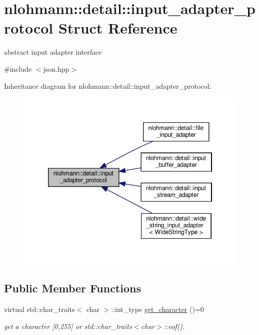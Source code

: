 \hypertarget{structnlohmann_1_1detail_1_1input__adapter__protocol}{}\section{nlohmann\+:\+:detail\+:\+:input\+\_\+adapter\+\_\+protocol Struct Reference}
\label{structnlohmann_1_1detail_1_1input__adapter__protocol}


abstract input adapter interface  




{\ttfamily \#include $<$json.\+hpp$>$}



Inheritance diagram for nlohmann\+:\+:detail\+:\+:input\+\_\+adapter\+\_\+protocol\+:
\nopagebreak
\begin{figure}[H]
\begin{center}
\leavevmode
\includegraphics[width=346pt]{structnlohmann_1_1detail_1_1input__adapter__protocol__inherit__graph}
\end{center}
\end{figure}
\subsection*{Public Member Functions}
\begin{DoxyCompactItemize}
\item 
\mbox{\label{structnlohmann_1_1detail_1_1input__adapter__protocol_aac10a6a4048a8ce8e2ed50277692a3ca}} 
virtual std\+::char\+\_\+traits$<$ char $>$\+::int\+\_\+type \hyperlink{structnlohmann_1_1detail_1_1input__adapter__protocol_aac10a6a4048a8ce8e2ed50277692a3ca}{get\+\_\+character} ()=0
\begin{DoxyCompactList}\small\item\em get a character \mbox{[}0,255\mbox{]} or std\+::char\+\_\+traits$<$char$>$\+::eof(). \end{DoxyCompactList}\end{DoxyCompactItemize}


